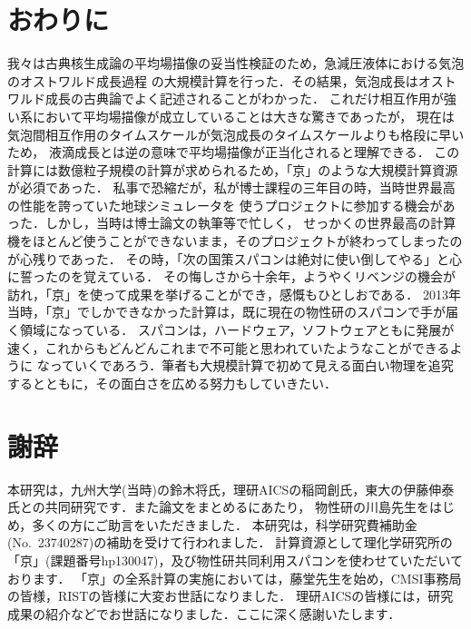 \documentclass[topics,b5paper,papersize,twocolumn]{jsarticle}
\begin{document}
\section{おわりに}

我々は古典核生成論の平均場描像の妥当性検証のため，急減圧液体における気泡のオストワルド成長過程
の大規模計算を行った．その結果，気泡成長はオストワルド成長の古典論でよく記述されることがわかった．
これだけ相互作用が強い系において平均場描像が成立していることは大きな驚きであったが，
現在は気泡間相互作用のタイムスケールが気泡成長のタイムスケールよりも格段に早いため，
液滴成長とは逆の意味で平均場描像が正当化されると理解できる．
この計算には数億粒子規模の計算が求められるため，「京」のような大規模計算資源が必須であった．
私事で恐縮だが，私が博士課程の三年目の時，当時世界最高の性能を誇っていた地球シミュレータを
使うプロジェクトに参加する機会があった．しかし，当時は博士論文の執筆等で忙しく，
せっかくの世界最高の計算機をほとんど使うことができないまま，そのプロジェクトが終わってしまったのが心残りであった．
その時，「次の国策スパコンは絶対に使い倒してやる」と心に誓ったのを覚えている．
その悔しさから十余年，ようやくリベンジの機会が訪れ，「京」を使って成果を挙げることができ，感慨もひとしおである．
2013年当時，「京」でしかできなかった計算は，既に現在の物性研のスパコンで手が届く領域になっている．
スパコンは，ハードウェア，ソフトウェアともに発展が速く，これからもどんどんこれまで不可能と思われていたようなことができるように
なっていくであろう．筆者も大規模計算で初めて見える面白い物理を追究するとともに，その面白さを広める努力もしていきたい．

\section*{謝辞}
本研究は，九州大学(当時)の鈴木将氏，理研AICSの稲岡創氏，東大の伊藤伸泰氏との共同研究です．また論文をまとめるにあたり，
物性研の川島先生をはじめ，多くの方にご助言をいただきました．
本研究は，科学研究費補助金(No.~23740287)の補助を受けて行われました．
計算資源として理化学研究所の「京」(課題番号hp130047)，及び物性研共同利用スパコンを使わせていただいております．
「京」の全系計算の実施においては，藤堂先生を始め，CMSI事務局の皆様，RISTの皆様に大変お世話になりました．
理研AICSの皆様には，研究成果の紹介などでお世話になりました．ここに深く感謝いたします．
\end{document}
